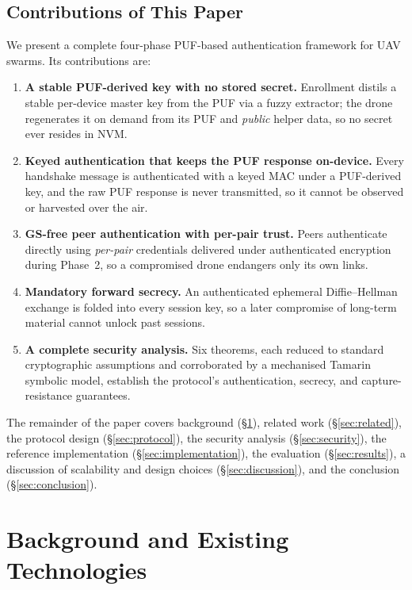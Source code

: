\documentclass[11pt,a4paper]{article}
\begin{document}
\subsection{Contributions of This Paper}

We present a complete four-phase PUF-based authentication framework for UAV
swarms. Its contributions are:
\begin{enumerate}[leftmargin=*]
  \item \textbf{A stable PUF-derived key with no stored secret.} Enrollment
  distils a stable per-device master key from the PUF via a fuzzy extractor;
  the drone regenerates it on demand from its PUF and \emph{public} helper
  data, so no secret ever resides in NVM.
  \item \textbf{Keyed authentication that keeps the PUF response on-device.}
  Every handshake message is authenticated with a keyed MAC under a
  PUF-derived key, and the raw PUF response is never transmitted, so it cannot
  be observed or harvested over the air.
  \item \textbf{GS-free peer authentication with per-pair trust.} Peers
  authenticate directly using \emph{per-pair} credentials delivered under
  authenticated encryption during Phase~2, so a compromised drone endangers
  only its own links.
  \item \textbf{Mandatory forward secrecy.} An authenticated ephemeral
  Diffie--Hellman exchange is folded into every session key, so a later
  compromise of long-term material cannot unlock past sessions.
  \item \textbf{A complete security analysis.} Six theorems, each reduced to
  standard cryptographic assumptions and corroborated by a mechanised Tamarin
  symbolic model, establish the protocol's authentication, secrecy, and
  capture-resistance guarantees.
\end{enumerate}

The remainder of the paper covers background (\S\ref{sec:background}), related
work (\S\ref{sec:related}), the protocol design (\S\ref{sec:protocol}), the
security analysis (\S\ref{sec:security}), the reference implementation
(\S\ref{sec:implementation}), the evaluation (\S\ref{sec:results}), a discussion
of scalability and design choices (\S\ref{sec:discussion}), and the conclusion
(\S\ref{sec:conclusion}).

\section{Background and Existing Technologies}
\label{sec:background}
\end{document}
